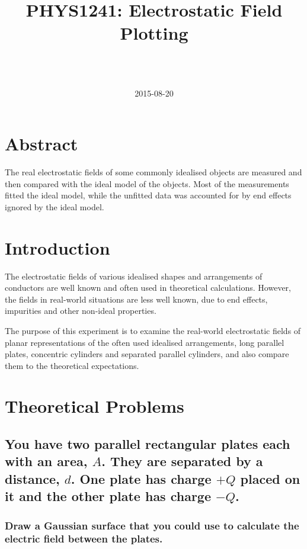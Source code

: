 \documentclass[a4paper]{scrartcl}
\begin{document}
\title{PHYS1241: Electrostatic Field Plotting}
\author{ \\ \\ }
\date{2015-08-20}
\maketitle

\section{Abstract}
The real electrostatic fields of some commonly idealised objects are measured and then compared with the ideal model of the objects. Most of the measurements fitted the ideal model, while the unfitted data was accounted for by end effects ignored by the ideal model.

\section{Introduction}
The electrostatic fields of various idealised shapes and arrangements of conductors are well known and often used in theoretical calculations. However, the fields in real-world situations are less well known, due to end effects, impurities and other non-ideal properties.

The purpose of this experiment is to examine the real-world electrostatic fields of planar representations of the often used idealised arrangements, long parallel plates, concentric cylinders and separated parallel cylinders, and also compare them to the theoretical expectations.

\section{Theoretical Problems}
\subsection{You have two parallel rectangular plates each with an area, \(A\). They are separated by a distance, \(d\). One plate has charge \(+Q\) placed on it and the other plate has charge \(-Q\).}
\subsubsection{Draw a Gaussian surface that you could use to calculate the electric field between the plates.}
\begin{center}
\end{center}
\end{document}

